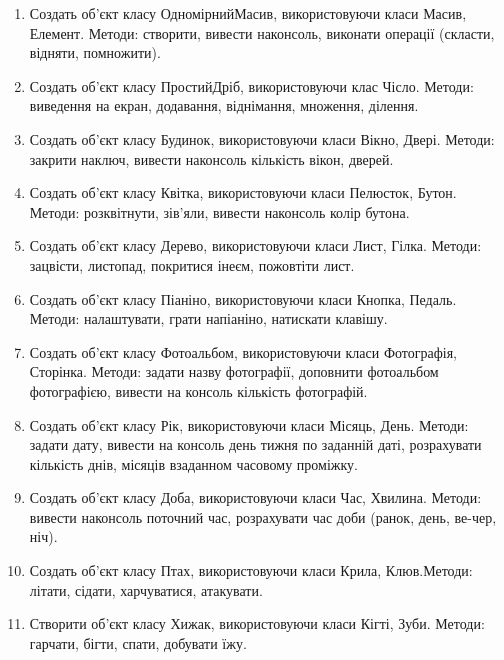 \documentclass[]{article}
\begin{document}
\begin{enumerate}
\item
Создать об'єкт класу ОдномірнийМасив, використовуючи класи Масив, Елемент. Методи: створити, вивести наконсоль, виконати операції (скласти, відняти, помножити).
\item
Создать об'єкт класу ПростийДріб, використовуючи клас Чісло. Методи: виведення на екран, додавання, віднімання, множення, ділення.
\item
Создать об'єкт класу Будинок, використовуючи класи Вікно, Двері. Методи: закрити наключ, вивести наконсоль кількість вікон, дверей.
\item
Создать об'єкт класу Квітка, використовуючи класи Пелюсток, Бутон. Методи: розквітнути, зів'яли, вивести наконсоль колір бутона.
\item
Создать об'єкт класу Дерево, використовуючи класи Лист, Гілка. Методи: зацвісти, листопад, покритися інеєм, пожовтіти лист.
\item
Создать об'єкт класу Піаніно, використовуючи класи Кнопка, Педаль. Методи: налаштувати, грати напіаніно, натискати клавішу.
\item
Создать об'єкт класу Фотоальбом, використовуючи класи Фотографія, Сторінка. Методи: задати назву фотографії, доповнити фотоальбом фотографією, вивести на консоль кількість фотографій.
\item
Создать об'єкт класу Рік, використовуючи класи Місяць, День. Методи: задати дату, вивести на консоль день тижня по заданній даті, розрахувати кількість днів, місяців взаданном часовому проміжку.
\item
Создать об'єкт класу Доба, використовуючи класи Час, Хвилина. Методи: вивести наконсоль поточний час, розрахувати час доби (ранок, день, ве-чер, ніч).
\item
Создать об'єкт класу Птах, використовуючи класи Крила, Клюв.Методи: літати, сідати, харчуватися, атакувати.
\item
Створити об'єкт класу Хижак, використовуючи класи Кігті, Зуби. Методи: гарчати, бігти, спати, добувати їжу.
\end{enumerate}
\end{document}
